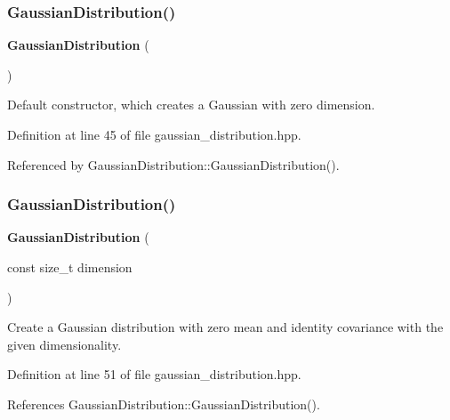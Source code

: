 \subsubsection{Gaussian\+Distribution()\hspace{0.1cm}{\footnotesize\ttfamily [1/3]}}
{\footnotesize\ttfamily \textbf{ Gaussian\+Distribution} (\begin{DoxyParamCaption}{ }\end{DoxyParamCaption})\hspace{0.3cm}{\ttfamily [inline]}}



Default constructor, which creates a Gaussian with zero dimension. 



Definition at line 45 of file gaussian\+\_\+distribution.\+hpp.



Referenced by Gaussian\+Distribution\+::\+Gaussian\+Distribution().

\mbox{\label{classmlpack_1_1distribution_1_1GaussianDistribution_a050cc3343306ceecd93f1ac9681c5e9f}} 
\subsubsection{Gaussian\+Distribution()\hspace{0.1cm}{\footnotesize\ttfamily [2/3]}}
{\footnotesize\ttfamily \textbf{ Gaussian\+Distribution} (\begin{DoxyParamCaption}\item[{const size\+\_\+t}]{dimension }\end{DoxyParamCaption})\hspace{0.3cm}{\ttfamily [inline]}}



Create a Gaussian distribution with zero mean and identity covariance with the given dimensionality. 



Definition at line 51 of file gaussian\+\_\+distribution.\+hpp.



References Gaussian\+Distribution\+::\+Gaussian\+Distribution().

